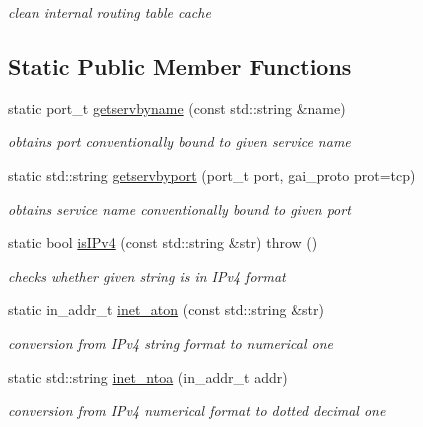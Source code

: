 \begin{CompactItemize}
\begin{CompactList}\small\item\em clean internal routing table cache \item\end{CompactList}\end{CompactItemize}
\subsection*{Static Public Member Functions}
\begin{CompactItemize}
\item 
static port\_\-t \hyperlink{classsocketpp_1_1AddrHandler_aa24239225e2a35cce9322dfa68bf438}{getservbyname} (const std::string \&name)
\begin{CompactList}\small\item\em obtains port conventionally bound to given service name \item\end{CompactList}\item 
static std::string \hyperlink{classsocketpp_1_1AddrHandler_c099c4bdf0b45e5d4a1e5806d896768e}{getservbyport} (port\_\-t port, gai\_\-proto prot=tcp)
\begin{CompactList}\small\item\em obtains service name conventionally bound to given port \item\end{CompactList}\item 
static bool \hyperlink{classsocketpp_1_1AddrHandler_652e24c273f7905cebf8d04b3cfef74d}{isIPv4} (const std::string \&str)  throw ()
\begin{CompactList}\small\item\em checks whether given string is in IPv4 format \item\end{CompactList}\item 
static in\_\-addr\_\-t \hyperlink{classsocketpp_1_1AddrHandler_e2eda37cd4c20059c557e4e65c829cf8}{inet\_\-aton} (const std::string \&str)
\begin{CompactList}\small\item\em conversion from IPv4 string format to numerical one \item\end{CompactList}\item 
static std::string \hyperlink{classsocketpp_1_1AddrHandler_a4377d84c8ea976aeada2b2eb0ac248d}{inet\_\-ntoa} (in\_\-addr\_\-t addr)
\begin{CompactList}\small\item\em conversion from IPv4 numerical format to dotted decimal one \item\end{CompactList}\end{CompactItemize}

